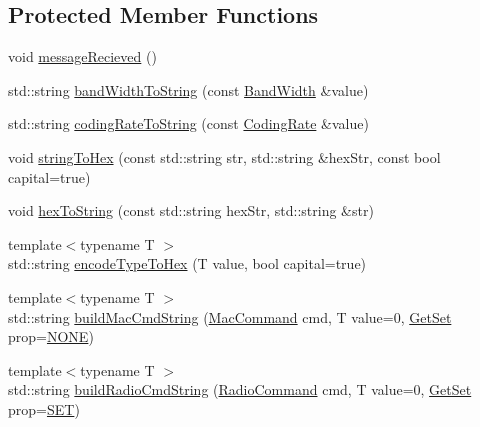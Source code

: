 \subsection*{Protected Member Functions}
\begin{DoxyCompactItemize}
\item 
void \hyperlink{classo_cpt_1_1_lo_ra_a606eeaec7fb73b483f958005444246b4}{message\+Recieved} ()
\item 
std\+::string \hyperlink{classo_cpt_1_1_lo_ra_a225b527e6f098ae6b481ed56edb0744c}{band\+Width\+To\+String} (const \hyperlink{classo_cpt_1_1_lo_ra_abb27d22a584625eea0339906152c031d}{Band\+Width} \&value)
\item 
std\+::string \hyperlink{classo_cpt_1_1_lo_ra_a404a9de4e173c0f17c7ca6a915a7fa4b}{coding\+Rate\+To\+String} (const \hyperlink{classo_cpt_1_1_lo_ra_a9bbdbc3b6fefdabd52bbb3ebbebcee7a}{Coding\+Rate} \&value)
\item 
void \hyperlink{classo_cpt_1_1_lo_ra_a3671543fd5f0297ca7e7fb533020bea9}{string\+To\+Hex} (const std\+::string str, std\+::string \&hex\+Str, const bool capital=true)
\item 
void \hyperlink{classo_cpt_1_1_lo_ra_a9a85cc1457a2e791c4eb4d1805b416fc}{hex\+To\+String} (const std\+::string hex\+Str, std\+::string \&str)
\item 
{\footnotesize template$<$typename T $>$ }\\std\+::string \hyperlink{classo_cpt_1_1_lo_ra_a49199ac50e2771b874331e2dffaa8b2c}{encode\+Type\+To\+Hex} (T value, bool capital=true)
\item 
{\footnotesize template$<$typename T $>$ }\\std\+::string \hyperlink{classo_cpt_1_1_lo_ra_a2e9c8a00010caa88fb917586a7f79195}{build\+Mac\+Cmd\+String} (\hyperlink{classo_cpt_1_1_lo_ra_a25bdbc01f200d6acca984a06e05fb878}{Mac\+Command} cmd, T value=0, \hyperlink{classo_cpt_1_1_lo_ra_ab2678032cac766b630fb06002f0db91a}{Get\+Set} prop=\hyperlink{classo_cpt_1_1_lo_ra_ab2678032cac766b630fb06002f0db91aac7c88dab7b4d0b1729148c5fb3ead0a3}{N\+O\+NE})
\item 
{\footnotesize template$<$typename T $>$ }\\std\+::string \hyperlink{classo_cpt_1_1_lo_ra_a936158f0266e734786ed323f7b7f7a82}{build\+Radio\+Cmd\+String} (\hyperlink{classo_cpt_1_1_lo_ra_ae987280d2d608bf474dc3f490790bc74}{Radio\+Command} cmd, T value=0, \hyperlink{classo_cpt_1_1_lo_ra_ab2678032cac766b630fb06002f0db91a}{Get\+Set} prop=\hyperlink{classo_cpt_1_1_lo_ra_ab2678032cac766b630fb06002f0db91aa6f1ce6bf9072aeeb8a1296caa25ea324}{S\+ET})

\end{DoxyCompactItemize}
